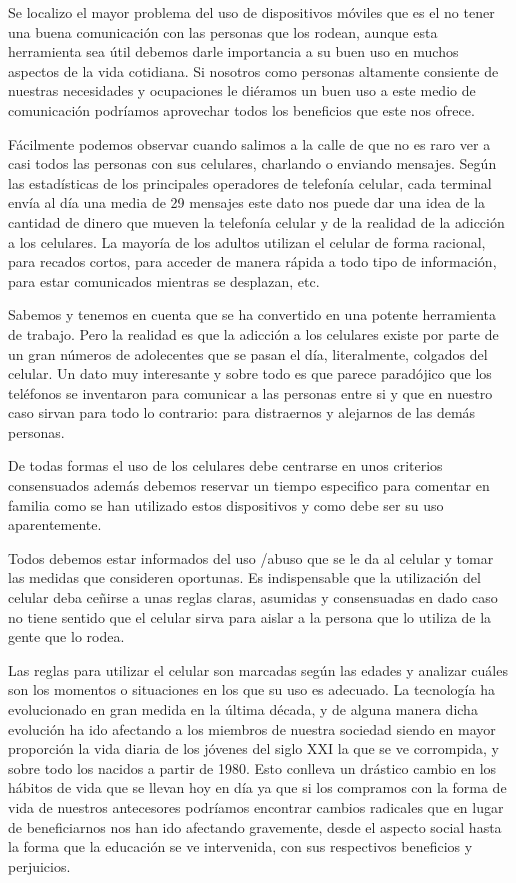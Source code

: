 \documentclass[10pt,a4paper]{article}
\begin{document}
Se localizo el mayor problema del uso de dispositivos m{\'o}viles que es el no tener una buena comunicaci{\'o}n con las personas que los rodean, aunque esta herramienta sea {\'u}til debemos darle importancia a su buen uso en muchos aspectos de la vida cotidiana. Si nosotros como personas altamente consiente de nuestras necesidades y ocupaciones le di{\'e}ramos un buen uso a este medio de comunicaci{\'o}n podr{\'i}amos aprovechar todos los beneficios que este nos ofrece.

F{\'a}cilmente podemos observar cuando salimos a la calle de que no es raro ver a casi todos las personas con sus celulares, charlando o enviando mensajes. Seg{\'u}n las estad{\'i}sticas de los principales operadores de telefon{\'i}a celular, cada terminal env{\'i}a al d{\'i}a una media de 29 mensajes este dato nos puede dar una idea de la cantidad de dinero que mueven la telefon{\'i}a celular y de la realidad de la adicci{\'o}n a los celulares. La mayor{\'i}a de los adultos utilizan el celular de forma racional, para recados cortos, para acceder de manera r{\'a}pida a todo tipo de informaci{\'o}n, para estar comunicados mientras se desplazan, etc.

Sabemos y tenemos en cuenta que se ha convertido en una potente herramienta de trabajo. Pero la realidad es que la adicci{\'o}n a los celulares existe por parte de un gran n{\'u}meros de adolecentes que se pasan el d{\'i}a, literalmente, colgados del celular. Un dato muy interesante y sobre todo es que parece parad{\'o}jico que los tel{\'e}fonos se inventaron para comunicar a las personas entre si y que en nuestro caso sirvan para todo lo contrario: para distraernos y alejarnos de las dem{\'a}s personas.

De todas formas el uso de los celulares debe centrarse en unos criterios consensuados adem{\'a}s debemos reservar un tiempo especifico para comentar en familia como se han utilizado estos dispositivos y como debe ser su uso aparentemente. 

Todos debemos estar informados del uso /abuso que se le da al celular y tomar las medidas que consideren oportunas. Es indispensable que la utilizaci{\'o}n del celular deba ce{\~n}irse a unas reglas claras, asumidas y consensuadas en dado caso no tiene sentido que el celular sirva para aislar a la persona que lo utiliza de la gente que lo rodea.

Las reglas para utilizar el celular son marcadas seg{\'u}n las edades y analizar cu{\'a}les son los momentos o situaciones en los que su uso es adecuado. La tecnolog{\'i}a ha evolucionado en gran medida en la {\'u}ltima d{\'e}cada, y de alguna manera dicha evoluci{\'o}n ha ido afectando a los miembros de nuestra sociedad siendo en mayor proporci{\'o}n la vida diaria de los j{\'o}venes del siglo XXI la que se ve corrompida, y sobre todo los nacidos a partir de 1980.
Esto conlleva un dr{\'a}stico cambio en los h{\'a}bitos de vida que se llevan hoy en d{\'i}a ya que si los compramos con la forma de vida de nuestros antecesores podr{\'i}amos encontrar cambios radicales que en lugar de beneficiarnos nos han ido afectando gravemente, desde el aspecto social hasta la forma que la educaci{\'o}n se ve intervenida, con sus respectivos beneficios y perjuicios. 
\end{document}
